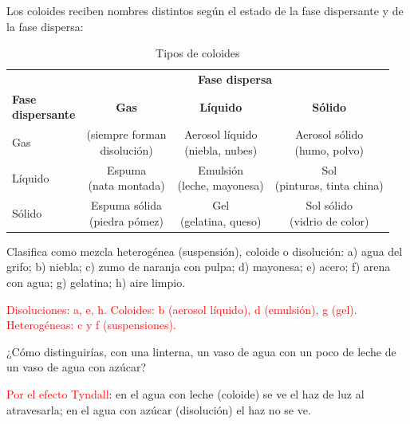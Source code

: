 Los coloides reciben nombres distintos según el estado de la fase dispersante y de la fase dispersa:

\begin{table}[H]
    \centering
    \caption{Tipos de coloides}
    \vspace{-5pt}
    \begin{tabular}{@{}lccc@{}}
        \toprule
        & \multicolumn{3}{c}{\textbf{Fase dispersa}} \\
        \cmidrule(l){2-4}
        \makecell{\textbf{Fase} \\ \textbf{dispersante}} & \textbf{Gas} & \textbf{Líquido} & \textbf{Sólido} \\
        \midrule
        Gas & \makecell{(siempre forman \\ disolución)} & \makecell{Aerosol líquido \\ (niebla, nubes)} & \makecell{Aerosol sólido \\ (humo, polvo)} \\[3pt]
        Líquido & \makecell{Espuma \\ (nata montada)} & \makecell{Emulsión \\ (leche, mayonesa)} & \makecell{Sol \\ (pinturas, tinta china)} \\[3pt]
        Sólido & \makecell{Espuma sólida \\ (piedra pómez)} & \makecell{Gel \\ (gelatina, queso)} & \makecell{Sol sólido \\ (vidrio de color)} \\
        \bottomrule
    \end{tabular}
    \label{tab:ud2-coloides}
\end{table}

\begin{exercise}
    Clasifica como mezcla heterogénea (suspensión), coloide o disolución: a) agua del grifo; b) niebla; c) zumo de naranja con
    pulpa; d) mayonesa; e) acero; f) arena con agua; g) gelatina; h) aire limpio.
    \begin{solu}
        \textcolor{red}{Disoluciones: a, e, h. Coloides: b (aerosol líquido), d (emulsión), g (gel). Heterogéneas: c y f
        (suspensiones).}
    \end{solu}
\end{exercise}

\begin{exercise}
    ¿Cómo distinguirías, con una linterna, un vaso de agua con un poco de leche de un vaso de agua con azúcar?
    \begin{solu}
        \textcolor{red}{Por el efecto Tyndall}: en el agua con leche (coloide) se ve el haz de luz al atravesarla; en el agua con
        azúcar (disolución) el haz no se ve.
    \end{solu}
\end{exercise}


